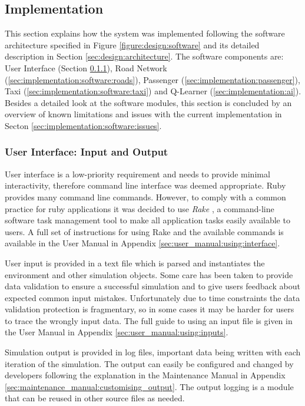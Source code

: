 \subsection{Implementation}
\label{sec:implementation:software}

This section explains how the system was implemented following the software
architecture specified in Figure \ref{figure:design:software} and its detailed
description in Section \ref{sec:design:architecture}. The software components
are: User Interface (Section \ref{sec:implementation:software:ui}), Road
Network (\ref{sec:implementation:software:roads}), Passenger
(\ref{sec:implementation:passenger}), Taxi
(\ref{sec:implementation:software:taxi}) and Q-Learner
(\ref{sec:implementation:ai}). Besides a detailed look at the software modules,
this section is concluded by an overview of known limitations and issues with
the current implementation in Secton \ref{sec:implementation:software:issues}.


\subsubsection{User Interface: Input and Output}
\label{sec:implementation:software:ui}

User interface is a low-priority requirement and needs to provide minimal
interactivity, therefore command line interface was deemed appropriate. Ruby
provides many command line commands. However, to comply with a common practice
for ruby applications it was decided to use \textit{Rake} \parencite{Rake}, a
command-line software task management tool to make all application tasks easily
available to users. A full set of instructions for using Rake and the available
commands is available in the User Manual in Appendix
\ref{sec:user_manual:using:interface}.

User input is provided in a text file which is parsed and instantiates the
environment and other simulation objects. Some care has been taken to provide
data validation to ensure a successful simulation and to give users feedback
about expected common input mistakes. Unfortunately due to time constraints the
data validation protection is fragmentary, so in some cases it may be harder
for users to trace the wrongly input data. The full guide to using an input
file is given in the User Manual in Appendix
\ref{sec:user_manual:using:inputs}.

Simulation output is provided in log files, important data being written with
each iteration of the simulation. The output can easily be configured and
changed by developers following the explanation in the Maintenance Manual in
Appendix \ref{sec:maintenance_manual:customising_output}. The output logging is
a module that can be reused in other source files as needed.


